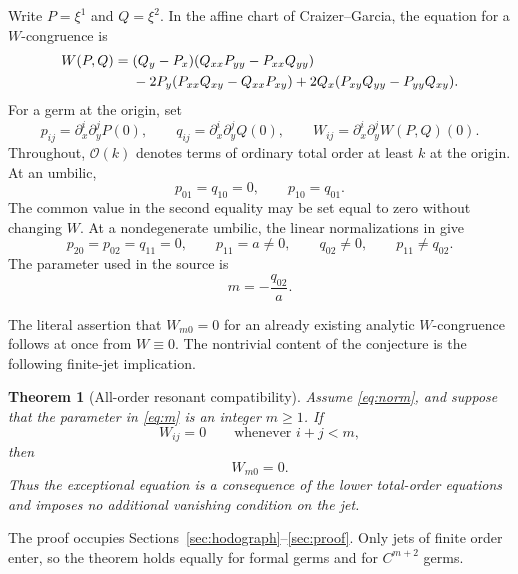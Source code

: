 \documentclass[11pt]{article}
\newtheorem{theorem}{Theorem}[section]
\theoremstyle{remark}
\newcommand{\cO}{\mathcal O}
\begin{document}
Write \(P=\xi^1\) and \(Q=\xi^2\).  In the affine chart of
Craizer--Garcia, the equation for a \(W\)-congruence is
\begin{align}
 W(P,Q)={}&(Q_y-P_x)(Q_{xx}P_{yy}-P_{xx}Q_{yy}) \notag\\
 &-2P_y(P_{xx}Q_{xy}-Q_{xx}P_{xy})
 +2Q_x(P_{xy}Q_{yy}-P_{yy}Q_{xy}).                 \label{eq:W}
\end{align}
For a germ at the origin, set
\[
 p_{ij}=\partial_x^i\partial_y^jP(0),\qquad
 q_{ij}=\partial_x^i\partial_y^jQ(0),\qquad
 W_{ij}=\partial_x^i\partial_y^jW(P,Q)(0).
\]
Throughout, \(\cO(k)\) denotes terms of ordinary total order at least \(k\)
at the origin.
At an umbilic,
\[
 p_{01}=q_{10}=0,\qquad p_{10}=q_{01}.
\]
The common value in the second equality may be set equal to zero without
changing \(W\).  At a nondegenerate umbilic, the linear normalizations in
\cite{CG} give
\begin{equation}
 p_{20}=p_{02}=q_{11}=0,\qquad p_{11}=a\ne0,
 \qquad q_{02}\ne0,\qquad p_{11}\ne q_{02}.        \label{eq:norm}
\end{equation}
The parameter used in the source is
\begin{equation}
                              m=-\frac{q_{02}}a.       \label{eq:m}
\end{equation}

The literal assertion that \(W_{m0}=0\) for an already existing analytic
\(W\)-congruence follows at once from \(W\equiv0\).  The nontrivial content
of the conjecture is the following finite-jet implication.

\begin{theorem}[All-order resonant compatibility]                 \label{thm:main}
Assume \eqref{eq:norm}, and suppose that the parameter in
\eqref{eq:m} is an integer \(m\ge1\).  If
\begin{equation}
                  W_{ij}=0\qquad\text{whenever }i+j<m,             \label{eq:lower}
\end{equation}
then
\begin{equation}
                              W_{m0}=0.                             \label{eq:target}
\end{equation}
Thus the exceptional equation is a consequence of the lower total-order
equations and imposes no additional vanishing condition on the jet.
\end{theorem}

The proof occupies Sections~\ref{sec:hodograph}--\ref{sec:proof}.  Only
jets of finite order enter, so the theorem holds equally for formal germs
and for \(C^{m+2}\) germs.
\end{document}
